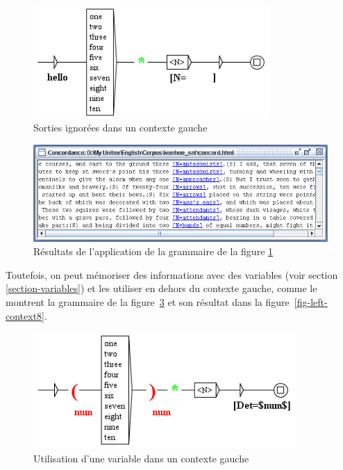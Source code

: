 \begin{figure}[!ht]
\begin{center}
\includegraphics[width=9cm]{resources/img/fig6-17e.png}
\caption{Sorties ignorées dans un contexte gauche\label{fig-left-context5}}
\end{center}
\end{figure}

\begin{figure}[!ht]
\begin{center}
\includegraphics[width=15cm]{resources/img/fig6-17f.png}
\caption{Résultats de l'application de la grammaire de la figure
\ref{fig-left-context5}\label{fig-left-context6}}
\end{center}
\end{figure}

\bigskip
\noindent Toutefois, on peut mémoriser des informations avec des variables (voir section
\ref{section-variables}) et les utiliser en dehors du contexte gauche, comme le montrent la
grammaire de la figure~\ref{fig-left-context7} et son résultat dans la figure~\ref{fig-left-context8}.

\begin{figure}[!ht]
\begin{center}
\includegraphics[width=10cm]{resources/img/fig6-17g.png}
\caption{Utilisation d'une variable dans un contexte gauche\label{fig-left-context7}}
\end{center}
\end{figure}

